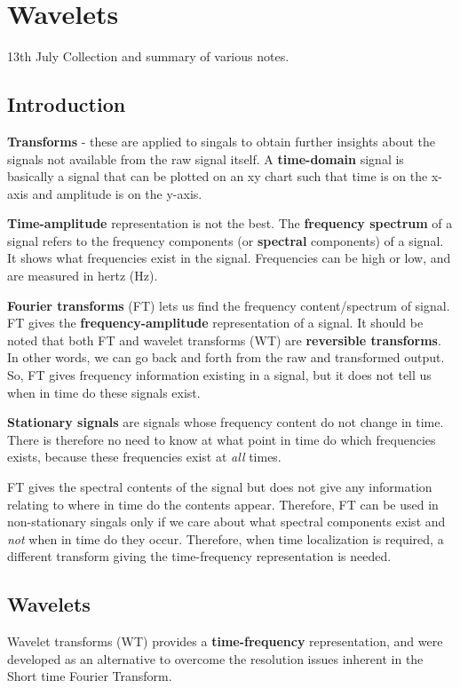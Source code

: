 \documentclass{article}
\begin{document}
	\section{Wavelets}
	13th July
	Collection and summary of various notes.
	\subsection{Introduction}
		
		\textbf{Transforms} - these are applied to singals to obtain further insights about the signals not available from the raw signal itself. A \textbf{time-domain} signal is basically a signal that can be plotted on an xy chart such that time is on the x-axis and amplitude is on the y-axis.
		
		\textbf{Time-amplitude} representation is not the best.
		The \textbf{frequency spectrum} of a signal refers to the frequency components (or \textbf{spectral} components) of a signal. It shows what frequencies exist in the signal. Frequencies can be high or low, and are measured in hertz (Hz).
		
		\textbf{Fourier transforms} (FT) lets us find the frequency content/spectrum of signal. FT gives the \textbf{frequency-amplitude} representation of a signal. 
		It should be noted that both FT and wavelet transforms (WT) are \textbf{reversible transforms}. In other words, we can go back and forth from the raw and transformed output. So, FT gives frequency information existing in a signal, but it does not tell us when in time do these signals exist. 
		
		\textbf{Stationary signals} are signals whose frequency content do not change in time. There is therefore no need to know at what point in time do which frequencies exists, because these frequencies exist at \textit{all} times.
		
		FT gives the spectral contents of the signal but does not give any information relating to where in time do the contents appear. Therefore, FT can be used in non-stationary singals only if we care about what spectral components exist and \textit{not} when in time do they occur. Therefore, when time localization is required, a different transform giving the time-frequency representation is needed.
		\subsection{Wavelets}
		Wavelet transforms (WT) provides a \textbf{time-frequency} representation, and were developed as an alternative to overcome the resolution issues inherent in the Short time Fourier Transform. 
		
\end{document}
